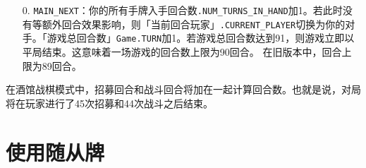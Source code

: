 \begin{enumerate}
    \item[0.] \texttt{MAIN\_NEXT}：你的所有手牌入手回合数\texttt{.NUM\_TURNS\_IN\_HAND}加1。若此时没有等额外回合效果影响，则「当前回合玩家」\texttt{.CURRENT\_PLAYER}切换为你的对手。「游戏总回合数」\texttt{Game.TURN}加1。若游戏总回合数达到91，则游戏立即以平局结束。这意味着一场游戏的回合数上限为90回合。
        \history 在旧版本中，回合上限为89回合。
\end{enumerate}

在酒馆战棋模式中，招募回合和战斗回合将加在一起计算回合数。也就是说，对局将在玩家进行了45次招募和44次战斗之后结束。

\section{使用随从牌}

